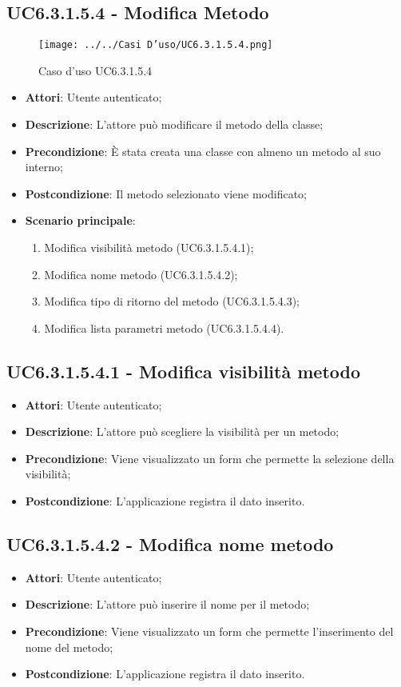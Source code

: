 \subsection{UC6.3.1.5.4 - Modifica Metodo} 
\label{ssec:UC6.3.1.5.4} 
\begin{figure}[h!] 
\centering 
\texttt{[image: ../../Casi D'uso/UC6.3.1.5.4.png]} 
\caption{Caso d'uso UC6.3.1.5.4} 
 \end{figure} 
\begin{itemize} 
\item \textbf{Attori}: Utente autenticato;
\item \textbf{Descrizione}: L'attore può modificare il metodo della classe;
\item \textbf{Precondizione}: È stata creata una classe con almeno un metodo al suo interno;
\item \textbf{Postcondizione}: Il metodo selezionato viene modificato;
\item \textbf{Scenario principale}: \begin{enumerate}\item Modifica visibilità metodo (UC6.3.1.5.4.1);\item Modifica nome metodo (UC6.3.1.5.4.2);\item Modifica tipo di ritorno del metodo (UC6.3.1.5.4.3);\item Modifica lista parametri metodo (UC6.3.1.5.4.4). 
 \end{enumerate}
\end{itemize} 
\subsection{UC6.3.1.5.4.1 - Modifica visibilità metodo} 
\label{ssec:UC6.3.1.5.4.1} 
\begin{itemize} 
\item \textbf{Attori}: Utente autenticato;
\item \textbf{Descrizione}: L'attore può scegliere la visibilità per un metodo;
\item \textbf{Precondizione}: Viene visualizzato un form che permette la selezione della visibilità;
\item \textbf{Postcondizione}: L'applicazione registra il dato inserito.
\end{itemize} 
\subsection{UC6.3.1.5.4.2 - Modifica nome metodo} 
\label{ssec:UC6.3.1.5.4.2} 
\begin{itemize} 
\item \textbf{Attori}: Utente autenticato;
\item \textbf{Descrizione}: L'attore può inserire il nome per il metodo;
\item \textbf{Precondizione}: Viene visualizzato un form che permette l'inserimento del nome del metodo;
\item \textbf{Postcondizione}: L'applicazione registra il dato inserito.
\end{itemize} 
